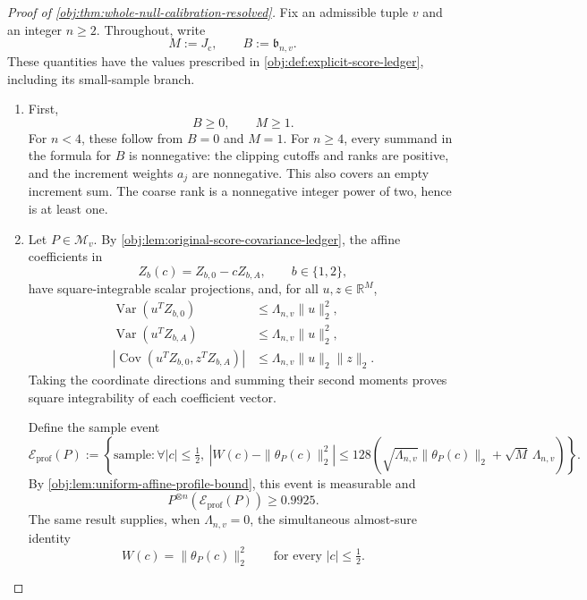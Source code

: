 \documentclass[11pt]{article}
\begin{document}
\begin{proof}[Proof of \cref{obj:thm:whole-null-calibration-resolved}]
Fix an admissible tuple \(v\) and an integer \(n\ge2\). Throughout, write
\[
M:=J_{\mathrm c},
\qquad
B:=\mathfrak b_{n,v}.
\]
These quantities have the values prescribed in \cref{obj:def:explicit-score-ledger}, including its small-sample branch.

\begin{enumerate}
\item First,
\[
B\ge0,
\qquad
M\ge1.
\]
For \(n<4\), these follow from \(B=0\) and \(M=1\). For \(n\ge4\), every summand in the formula for \(B\) is nonnegative: the clipping cutoffs and ranks are positive, and the increment weights \(a_j\) are nonnegative. This also covers an empty increment sum. The coarse rank is a nonnegative integer power of two, hence is at least one.

\item Let \(P\in\mathcal M_v\). By \cref{obj:lem:original-score-covariance-ledger}, the affine coefficients in
\[
Z_b(c)=Z_{b,0}-cZ_{b,A},
\qquad b\in\{1,2\},
\]
have square-integrable scalar projections, and, for all \(u,z\in\mathbb R^M\),
\[
\begin{aligned}
\operatorname{Var}(u^T Z_{b,0})
&\le \Lambda_{n,v}\|u\|_2^2,\\
\operatorname{Var}(u^T Z_{b,A})
&\le \Lambda_{n,v}\|u\|_2^2,\\
\left|\operatorname{Cov}(u^T Z_{b,0},z^T Z_{b,A})\right|
&\le \Lambda_{n,v}\|u\|_2\|z\|_2.
\end{aligned}
\]
Taking the coordinate directions and summing their second moments proves square integrability of each coefficient vector.

Define the sample event
\[
\mathcal E_{\mathrm{prof}}(P)
:=
\left\{
\text{sample}:
\forall |c|\le\tfrac12,\ 
\left|W(c)-\|\theta_P(c)\|_2^2\right|
\le
128\left(
\sqrt{\Lambda_{n,v}}\|\theta_P(c)\|_2
+\sqrt M\,\Lambda_{n,v}
\right)
\right\}.
\]
By \cref{obj:lem:uniform-affine-profile-bound}, this event is measurable and
\[
P^{\otimes n}\!\left(\mathcal E_{\mathrm{prof}}(P)\right)\ge0.9925.
\]
The same result supplies, when \(\Lambda_{n,v}=0\), the simultaneous almost-sure identity
\[
W(c)=\|\theta_P(c)\|_2^2
\qquad\text{for every }|c|\le\tfrac12.
\]


\end{enumerate}
\end{proof}
\end{document}
